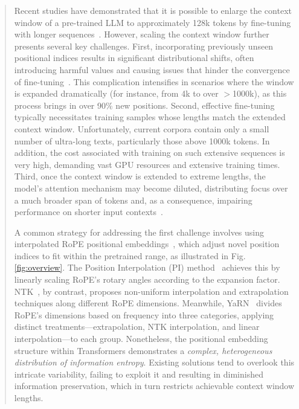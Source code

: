 \begin{abstract}
Recent studies have demonstrated that it is possible to enlarge the context window of a pre-trained LLM to approximately 128k tokens by fine-tuning with longer sequences~\cite{longlora,pi,yarn,zhang2024soaring,liu2023scaling}. However, scaling the context window further presents several key challenges. First, incorporating previously unseen positional indices results in significant distributional shifts, often introducing harmful values and causing issues that hinder the convergence of fine-tuning~\cite{pi}. This complication intensifies in scenarios where the window is expanded dramatically (for instance, from 4k to over $>$1000k), as this process brings in over 90\% new positions. Second, effective fine-tuning typically necessitates training samples whose lengths match the extended context window. Unfortunately, current corpora contain only a small number of ultra-long texts, particularly those above 1000k tokens. In addition, the cost associated with training on such extensive sequences is very high, demanding vast GPU resources and extensive training times. Third, once the context window is extended to extreme lengths, the model’s attention mechanism may become diluted, distributing focus over a much broader span of tokens and, as a consequence, impairing performance on shorter input contexts~\cite{pi}.

A common strategy for addressing the first challenge involves using interpolated RoPE positional embeddings~\cite{rope,pi}, which adjust novel position indices to fit within the pretrained range, as illustrated in Fig.\ref{fig:overview}. The Position Interpolation (PI) method~\cite{pi} achieves this by linearly scaling RoPE's rotary angles according to the expansion factor. NTK~\cite{ntk,dynamicntk}, by contrast, proposes non-uniform interpolation and extrapolation techniques along different RoPE dimensions. Meanwhile, YaRN~\cite{yarn} divides RoPE's dimensions based on frequency into three categories, applying distinct treatments—extrapolation, NTK interpolation, and linear interpolation—to each group. Nonetheless, the positional embedding structure within Transformers demonstrates a \emph{complex, heterogeneous distribution of information entropy}. Existing solutions tend to overlook this intricate variability, failing to exploit it and resulting in diminished information preservation, which in turn restricts achievable context window lengths.


\end{abstract}
